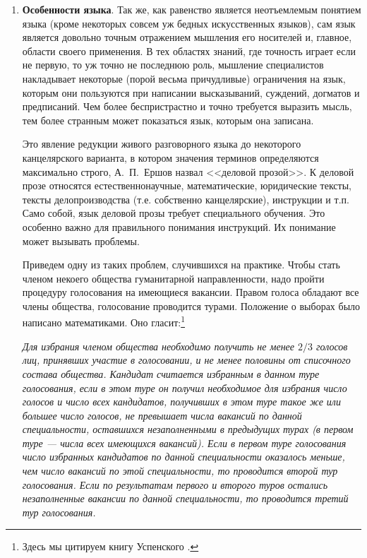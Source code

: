 \begin{enumerate}
\item \textbf{Особенности языка}. Так же, как равенство является неотъемлемым понятием языка (кроме некоторых совсем уж бедных искусственных языков), сам язык является довольно точным отражением мышления его носителей и, главное, области своего применения. В тех областях знаний, где точность играет если не первую, то уж точно не последнюю роль, мышление специалистов накладывает некоторые (порой весьма причудливые) ограничения на язык, которым они пользуются при написании высказываний, суждений, догматов и предписаний. Чем более беспристрастно и точно требуется выразить мысль, тем более странным может показаться язык, которым она записана.

Это явление редукции живого разговорного языка до некоторого канцелярского варианта, в котором значения терминов определяются максимально строго, А.~П.~Ершов назвал <<деловой прозой>>. К деловой прозе относятся естественнонаучные, математические, юридические тексты, тексты делопроизводства (т.е. собственно канцелярские), инструкции и т.п. Само собой, язык деловой прозы требует специального обучения. Это особенно важно для правильного понимания инструкций. Их понимание может вызывать проблемы.

Приведем одну из таких проблем, случившихся на практике. Чтобы стать членом некоего общества гуманитарной направленности, надо пройти процедуру голосования на имеющиеся вакансии. Правом голоса обладают все члены общества, голосование проводится турами. Положение о выборах было написано
математиками. Оно гласит:\footnote{Здесь мы цитируем книгу Успенского \cite{Usp0}.}

\textit{Для избрания членом общества необходимо получить
не менее $2/3$ голосов лиц, принявших участие в голосовании, и не менее половины от списочного состава
общества. Кандидат считается избранным в данном туре
голосования, если в этом туре он получил необходимое
для избрания число голосов и число всех кандидатов,
получивших в этом туре такое же или большее число
голосов, не превышает числа вакансий по данной специальности, оставшихся незаполненными в предыдущих
турах (в первом туре --- числа всех имеющихся вакансий). Если в первом туре голосования число избранных
кандидатов по данной специальности оказалось меньше,
чем число вакансий по этой специальности, то проводится второй тур голосования. Если по результатам первого
и второго туров остались незаполненные вакансии по
данной специальности, то проводится третий тур голосования.
}


\end{enumerate}

